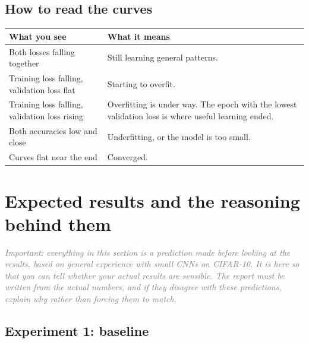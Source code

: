 \documentclass[11pt]{article}
\newcommand{\hedge}[1]{\textcolor{gray}{\textit{#1}}}
\begin{document}
\subsection{How to read the curves}

\begin{center}
\begin{tabular}{p{5.2cm}p{9cm}}
\toprule
What you see & What it means \\
\midrule
Both losses falling together & Still learning general patterns. \\
Training loss falling, validation loss flat & Starting to overfit. \\
Training loss falling, validation loss rising & Overfitting is under way. The epoch with the lowest validation loss is where useful learning ended. \\
Both accuracies low and close & Underfitting, or the model is too small. \\
Curves flat near the end & Converged. \\
\bottomrule
\end{tabular}
\end{center}

\section{Expected results and the reasoning behind them}

\hedge{Important: everything in this section is a prediction made before looking at the results, based on general experience with small CNNs on CIFAR-10. It is here so that you can tell whether your actual results are sensible. The report must be written from the actual numbers, and if they disagree with these predictions, explain why rather than forcing them to match.}

\subsection{Experiment 1: baseline}
\end{document}
